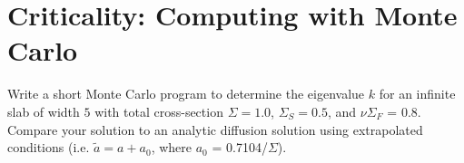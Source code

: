 \chapter[Criticality]{Criticality: Computing with Monte Carlo}
\label{lec:criticality}

\begin{exercises}

  \item Write a short Monte Carlo program to determine the eigenvalue $k$ for an infinite slab of width $5$ with total cross-section $\Sigma = 1.0$, $\Sigma_S = 0.5$, and $\nu\Sigma_F$ = 0.8.  Compare your solution to an analytic diffusion solution using extrapolated conditions (i.e. $\tilde{a} = a+a_0$, where $a_0$ = 0.7104/$\Sigma$).
\end{exercises}
